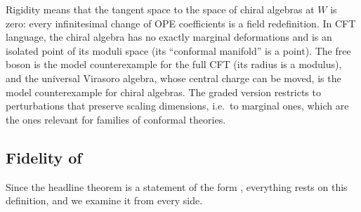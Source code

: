 \begin{physics}
Rigidity means that the tangent space to the space of chiral algebras at $W$ is zero: every
infinitesimal change of OPE coefficients is a field redefinition. In CFT language, the chiral algebra has
no exactly marginal deformations and is an isolated point of its moduli space (its ``conformal manifold''
is a point). The free boson is the model counterexample for the full CFT (its radius is a modulus), and the
universal Virasoro algebra, whose central charge can be moved, is the model counterexample for chiral
algebras. The graded version restricts to perturbations that preserve scaling dimensions, i.e.\ to
marginal ones, which are the ones relevant for families of conformal theories.
\end{physics}

\subsection{Fidelity of }\label{l07:sec:fidelity-rigid}

Since the headline theorem is a statement of the form ,
everything rests on this definition, and we examine it from every side.

